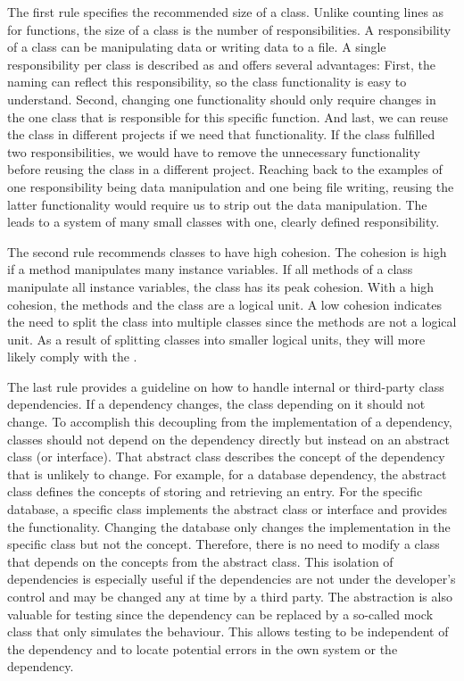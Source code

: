 The first rule specifies the recommended size of a class. Unlike counting lines as for functions, the size of a class is the number of responsibilities. A responsibility of a class can be manipulating data or writing data to a file. A single responsibility per class is described as  and offers several advantages: First, the naming can reflect this responsibility, so the class functionality is easy to understand.
Second, changing one functionality should only require changes in the one class that is responsible for this specific function. And last, we can reuse the class in different projects if we need that functionality. If the class fulfilled two responsibilities, we would have to remove the unnecessary functionality before reusing the class in a different project. Reaching back to the examples of one responsibility being data manipulation and one being file writing, reusing the latter functionality would require us to strip out the data manipulation.
The  leads to a system of many small classes with one, clearly defined responsibility.

The second rule recommends classes to have high cohesion. The cohesion is high if a method manipulates many instance variables. If all methods of a class manipulate all instance variables, the class has its peak cohesion. With a high cohesion, the methods and the class are a logical unit. A low cohesion indicates the need to split the class into multiple classes since the methods are not a logical unit. As a result of splitting classes into smaller logical units, they will more likely comply with the .

The last rule provides a guideline on how to handle internal or third-party class dependencies. If a dependency changes, the class depending on it should not change. To accomplish this decoupling from the implementation of a dependency, classes should not depend on the dependency directly but instead on an abstract class (or interface). That abstract class describes the concept of the dependency that is unlikely to change. For example, for a database dependency, the abstract class defines the concepts of storing and retrieving an entry. For the specific database, a specific class implements the abstract class or interface and provides the functionality. Changing the database only changes the implementation in the specific class but not the concept. Therefore, there is no need to modify a class that depends on the concepts from the abstract class. This isolation of dependencies is especially useful if the dependencies are not under the developer's control and may be changed any at time by a third party. The abstraction is also valuable for testing since the dependency can be replaced by a so-called mock class that only simulates the behaviour. This allows testing to be independent of the dependency and to locate potential errors in the own system or the dependency.

